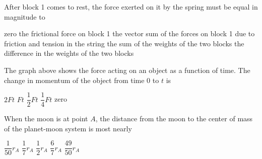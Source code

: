 \documentclass[12pt]{../../oss-classkick-exam}
\begin{document}
\begin{questions}
  \question After block 1 comes to rest, the force exerted on it by the spring
  must be equal in magnitude to
  \begin{choices}
    \choice zero
    \choice the frictional force on block 1
    \choice the vector sum of the forces on block 1 due to friction and tension
    in the string
    \choice the sum of the weights of the two blocks
    \choice the difference in the weights of the two blocks
  \end{choices}
  \label{spring2}
  
  \begin{center}
  \end{center}
  \question\vspace{-.1in}The graph above shows the force acting on an object as
  a function of time. The change in momentum of the object from time 0 to $t$ is

  \begin{oneparchoices}
    \choice $2Ft$
    \choice $Ft$
    \choice $\dfrac12Ft$
    \choice $\dfrac14Ft$
    \choice zero
  \end{oneparchoices}
  \vspace{.3in}
  

  \question When the moon is at point $A$, the distance from the moon to the
  center of mass of the planet-moon system is most nearly

  \begin{oneparchoices}
    \choice $\dfrac1{50}r_A$
    \choice $\dfrac17r_A$
    \choice $\dfrac12r_A$
    \choice $\dfrac67r_A$
    \choice $\dfrac{49}{50}r_A$
  \end{oneparchoices}
  \label{orbit1}
  \vspace{.3in}
  

\end{questions}
\end{document}
